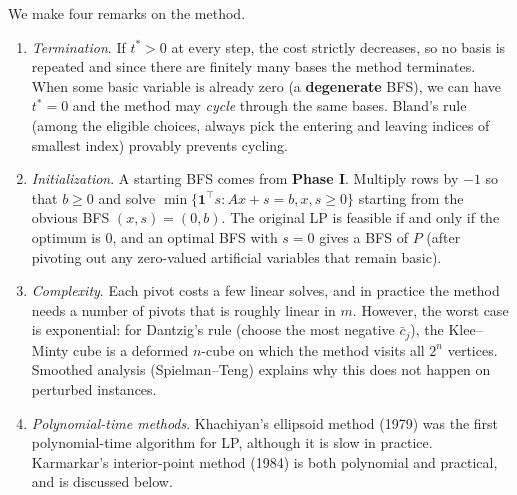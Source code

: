 	We make four remarks on the method. 
	\begin{enumerate}
		\item \textit{Termination}. If $t^\ast > 0$ at every step, the cost strictly decreases, so no basis is repeated and since there are finitely many bases the method terminates. When some basic variable is already zero (a \textbf{degenerate} BFS), we can have $t^\ast = 0$ and the method may \textit{cycle} through the same bases. Bland's rule (among the eligible choices, always pick the entering and leaving indices of smallest index) provably prevents cycling. 
		\item \textit{Initialization}. A starting BFS comes from \textbf{Phase I}. Multiply rows by $-1$ so that $b \geq 0$ and solve $\min\{ \mathbf{1}^\top s \colon Ax + s = b, x, s \geq 0\}$ starting from the obvious BFS $(x, s) = (0, b)$. The original LP is feasible if and only if the optimum is $0$, and an optimal BFS with $s = 0$ gives a BFS of $P$ (after pivoting out any zero-valued artificial variables that remain basic).
		\item \textit{Complexity}. Each pivot costs a few linear solves, and in practice the method needs a number of pivots that is roughly linear in $m$. However, the worst case is exponential: for Dantzig's rule (choose the most negative $\bar c_j$), the Klee--Minty cube is a deformed $n$-cube on which the method visits all $2^n$ vertices. Smoothed analysis (Spielman--Teng) explains why this does not happen on perturbed instances. 
		\item \textit{Polynomial-time methods}. Khachiyan's ellipsoid method (1979) was the first polynomial-time algorithm for LP, although it is slow in practice. Karmarkar's interior-point method (1984) is both polynomial and practical, and is discussed below. 
	\end{enumerate}

